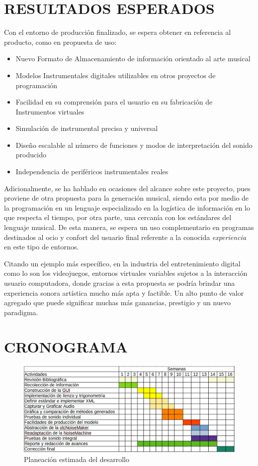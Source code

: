 \documentclass{book}
\begin{document}
	\section*{RESULTADOS ESPERADOS}
	Con el entorno de producción finalizado, se espera obtener en referencia al producto, como en propuesta de uso:
	\begin{itemize}
		\item Nuevo Formato de Almacenamiento de información orientado al arte musical
		\item Modelos Instrumentales digitales utilizables en otros proyectos de programación
		\item Facilidad en su comprensión para el usuario en su fabricación de Instrumentos virtuales
		\item Simulación de instrumental precisa y universal
		\item Diseño escalable al número de funciones y modos de interpretación del sonido producido
		\item Independencia de periféricos instrumentales reales
	\end{itemize}
	Adicionalmente, se ha hablado en ocasiones del alcance sobre este proyecto, pues proviene de otra propuesta para la generación musical, siendo esta por medio de la programación en un lenguaje especializado en la logística de información en lo que respecta el tiempo, por otra parte, una cercanía con los estándares del lenguaje musical. De esta manera, se espera un uso complementario en programas destinados al ocio y confort del usuario final referente a la conocida \emph{experiencia} en este tipo de entornos.\par
	
	Citando un ejemplo más específico, en la industria del entretenimiento digital como lo son los videojuegos, entornos virtuales variables sujetos a la interacción usuario computadora, donde gracias a esta propuesta se podría brindar una experiencia sonora artística mucho más apta y factible. Un alto punto de valor agregado que puede significar muchas más ganancias, prestigio y un nuevo paradigma.\par
	
	\section*{CRONOGRAMA}
	\begin{figure}[h]
		\includegraphics[width=\linewidth]{../Assets/images/cronograma}
		\caption{Planeación estimada del desarrollo}
	\end{figure} 
\end{document}
